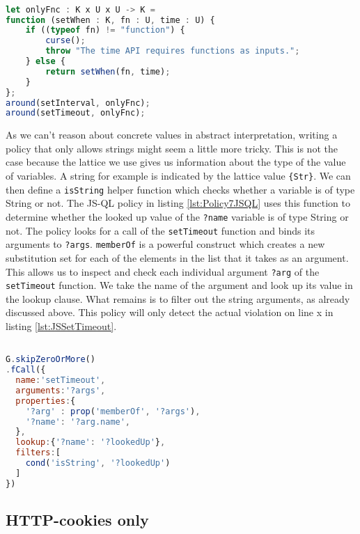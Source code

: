 \begin{lstlisting}[label={lst:Policy7Conscript},language=JavaScript,caption=Policy 7 in ConScript,mathescape=true]  % float=t?

let onlyFnc : K x U x U -> K =
function (setWhen : K, fn : U, time : U) {
    if ((typeof fn) != "function") {
        curse();
        throw "The time API requires functions as inputs.";
    } else {
        return setWhen(fn, time);
    }
};
around(setInterval, onlyFnc); 
around(setTimeout, onlyFnc);
\end{lstlisting}

As we can't reason about concrete values in abstract interpretation, writing a policy that only allows strings might seem a little more tricky. This is not the case because the lattice we use gives us information about the type of the value of variables. A string for example is indicated by the lattice value \texttt{\{Str\}}. We can then define a \texttt{isString} helper function which checks whether a variable is of type String or not. The JS-QL policy in listing \ref{lst:Policy7JSQL} uses this function to determine whether the looked up value of the \texttt{?name} variable is of type String or not. The policy looks for a call of the \texttt{setTimeout} function and binds its arguments to \texttt{?args}. \texttt{memberOf} is a powerful construct which creates a new substitution set for each of the elements in the list that it takes as an argument.
This allows us to inspect and check each individual argument \texttt{?arg} of the \texttt{setTimeout} function. We take the name of the argument and look up its value in the lookup clause. What remains is to filter out the string arguments, as already discussed above. This policy will only detect the actual violation on line x in listing \ref{lst:JSSetTimeout}.

\begin{lstlisting}[label={lst:Policy7JSQL},language=JavaScript,caption=Policy 7 in JS-QL,mathescape=true]  % float=t?

G.skipZeroOrMore()
.fCall({
  name:'setTimeout',
  arguments:'?args',
  properties:{
    '?arg' : prop('memberOf', '?args'),
    '?name': '?arg.name',
  },
  lookup:{'?name': '?lookedUp'},
  filters:[
    cond('isString', '?lookedUp')
  ]
})
\end{lstlisting}


\subsection{HTTP-cookies only}
\label{subsec:HTTPOnly}

